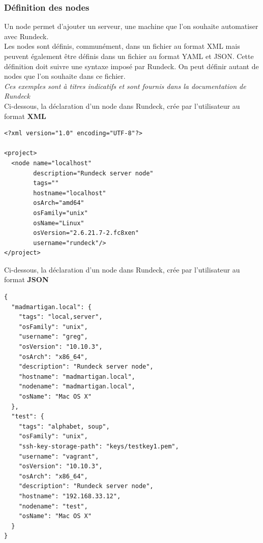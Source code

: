 \documentclass[12pt]{article}
\begin{document}
\subsubsection{Définition des nodes}
Un node permet d'ajouter un serveur, une machine que l'on souhaite automatiser avec Rundeck.
\\
Les nodes sont définis, communément, dans un fichier au format XML mais peuvent également être définis dans un fichier au format YAML et JSON. Cette définition doit suivre une syntaxe imposé par Rundeck. On peut définir autant de nodes que l'on souhaite dans ce fichier.
\vspace{0.5cm}
\\
\textit{Ces exemples sont à titres indicatifs et sont fournis dans la documentation de Rundeck}
\vspace{0.5cm}
\\
Ci-dessous, la déclaration d'un node dans Rundeck, crée par l'utilisateur au format \textbf{XML}
\vspace{0.5cm}
\\
\begin{lstlisting}
<?xml version="1.0" encoding="UTF-8"?>

<project>
  <node name="localhost" 
        description="Rundeck server node" 
        tags="" 
        hostname="localhost" 
        osArch="amd64" 
        osFamily="unix" 
        osName="Linux" 
        osVersion="2.6.21.7-2.fc8xen" 
        username="rundeck"/>
</project>
\end{lstlisting}

\vspace{0.5cm}
Ci-dessous, la déclaration d'un node dans Rundeck, crée par l'utilisateur au format \textbf{JSON}
\vspace{0.5cm}
\\

\begin{lstlisting}
{
  "madmartigan.local": {
    "tags": "local,server",
    "osFamily": "unix",
    "username": "greg",
    "osVersion": "10.10.3",
    "osArch": "x86_64",
    "description": "Rundeck server node",
    "hostname": "madmartigan.local",
    "nodename": "madmartigan.local",
    "osName": "Mac OS X"
  },
  "test": {
    "tags": "alphabet, soup",
    "osFamily": "unix",
    "ssh-key-storage-path": "keys/testkey1.pem",
    "username": "vagrant",
    "osVersion": "10.10.3",
    "osArch": "x86_64",
    "description": "Rundeck server node",
    "hostname": "192.168.33.12",
    "nodename": "test",
    "osName": "Mac OS X"
  }
}
\end{lstlisting}
\end{document}
